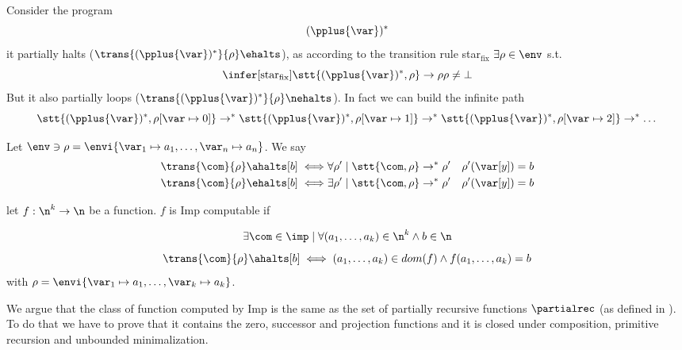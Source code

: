 \begin{example}\label{ex:partial}
  Consider the program \[(\pplus{\var})^*\] it partially halts
  (\(\trans{(\pplus{\var})^*}{\rho}\ehalts\)), as according to the
  transition rule star\(_{\text{fix}}\) \(\exists \rho \in \env\) s.t.
  \[\infer[\text{star}_{\text{fix}}]{\stt{(\pplus{\var})^*, \rho} \to
    \rho}{\rho \neq \bot}\] But it also partially loops
  (\(\trans{(\pplus{\var})^*}{\rho}\nehalts\)). In fact we can build
  the infinite path\[\stt{(\pplus{\var})^*, \rho[\var\mapsto 0]} \to^*
  \stt{(\pplus{\var})^*, \rho[\var\mapsto 1]} \to^*
  \stt{(\pplus{\var})^*, \rho[\var\mapsto 2]} \to^* \dots\]
\end{example}


\begin{notation}
  Let \(\env \ni \rho = \envi{\var_1\mapsto a_1, \dots, \var_n \mapsto
    a_n}\). We say
  \begin{align*}
    \trans{\com}{\rho}\ahalts[b] \iff & \forall \rho' \mid \stt{\com, \rho} \to^* \rho' \quad \rho'(\var[y]) = b \\
    \trans{\com}{\rho}\ehalts[b] \iff & \exists \rho' \mid \stt{\com, \rho} \to^* \rho' \quad \rho'(\var[y]) = b
  \end{align*}
\end{notation}



\begin{definition}
  let \(f : \n^k \to \n\) be a function. \(f\) is Imp computable if

  \[\exists \com \in\imp \mid \forall (a_1, \dots, a_k) \in \n^k \wedge
  b \in \n \] \[\trans{\com}{\rho} \ahalts[b] \iff (a_1, \dots, a_k)
  \in dom(f) \wedge f(a_1,\dots,a_k) = b\] with \(\rho = \envi{\var_1
    \mapsto a_1, \dots, \var_k \mapsto a_k}\).
\end{definition}

We argue that the class of function computed by Imp is the same as the
set of partially recursive functions \(\partialrec\) (as defined in
\cite{cutland1980computability}). To do that we have to prove that it
contains the zero, successor and projection functions and it is closed
under composition, primitive recursion and unbounded minimalization.

